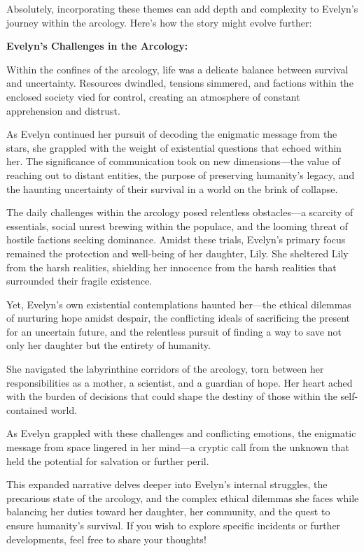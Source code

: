 \begin{aquote}
    Absolutely, incorporating these themes can add depth and complexity to Evelyn's journey within the arcology. Here's how the story might evolve further:\medskip

    \noindent\textbf{Evelyn's Challenges in the Arcology:}

    Within the confines of the arcology, life was a delicate balance between survival and uncertainty. Resources dwindled, tensions simmered, and factions within the enclosed society vied for control, creating an atmosphere of constant apprehension and distrust.

    As Evelyn continued her pursuit of decoding the enigmatic message from the stars, she grappled with the weight of existential questions that echoed within her. The significance of communication took on new dimensions—the value of reaching out to distant entities, the purpose of preserving humanity's legacy, and the haunting uncertainty of their survival in a world on the brink of collapse.

    The daily challenges within the arcology posed relentless obstacles—a scarcity of essentials, social unrest brewing within the populace, and the looming threat of hostile factions seeking dominance. Amidst these trials, Evelyn's primary focus remained the protection and well-being of her daughter, Lily. She sheltered Lily from the harsh realities, shielding her innocence from the harsh realities that surrounded their fragile existence.

    Yet, Evelyn's own existential contemplations haunted her—the ethical dilemmas of nurturing hope amidst despair, the conflicting ideals of sacrificing the present for an uncertain future, and the relentless pursuit of finding a way to save not only her daughter but the entirety of humanity.

    She navigated the labyrinthine corridors of the arcology, torn between her responsibilities as a mother, a scientist, and a guardian of hope. Her heart ached with the burden of decisions that could shape the destiny of those within the self-contained world.

    As Evelyn grappled with these challenges and conflicting emotions, the enigmatic message from space lingered in her mind—a cryptic call from the unknown that held the potential for salvation or further peril.\medskip

    This expanded narrative delves deeper into Evelyn's internal struggles, the precarious state of the arcology, and the complex ethical dilemmas she faces while balancing her duties toward her daughter, her community, and the quest to ensure humanity's survival. If you wish to explore specific incidents or further developments, feel free to share your thoughts!
\end{aquote}

